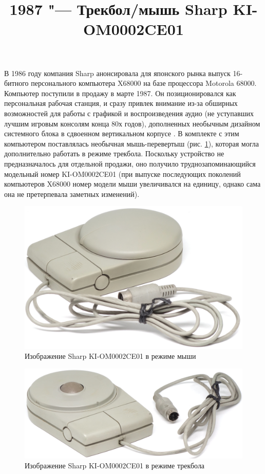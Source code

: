 \documentclass[11pt, a4paper]{article}
\begin{document}
\title{1987 "--- Трекбол/мышь Sharp KI-OM0002CE01}
\date{}
\maketitle
{}

В 1986 году компания Sharp анонсировала для японского рынка выпуск 16-битного персонального компьютера  X68000 на базе процессора Motorola 68000. Компьютер поступили в продажу в марте 1987. Он позиционировался как персональная рабочая станция, и сразу привлек внимание из-за обширных возможностей для работы с графикой и воспроизведения аудио (не уступавших лучшим игровым консолям конца 80х годов), дополненных необычным дизайном системного блока в сдвоенном вертикальном корпусе \cite{museum}. В комплекте с этим компьютером поставлялась необычная мышь-перевертыш (рис. \ref{fig:SharpConvertibleMouse}), которая могла дополнительно работать в режиме трекбола. Поскольку устройство не предназначалось для отдельной продажи, оно получило труднозапоминающийся модельный номер KI-OM0002CE01 (при выпуске последующих поколений компьютеров X68000 номер модели мыши увеличивался на единицу, однако сама она не претерпевала заметных изменений).

\begin{figure}[h]
    \centering
    \includegraphics[scale=0.65]{1987_sharp_convertible/picmouse_60}
    \caption{Изображение Sharp KI-OM0002CE01 в режиме мыши}
    \label{fig:SharpConvertibleMouse}
\end{figure}

\begin{figure}[h]
    \centering
    \includegraphics[scale=0.65]{1987_sharp_convertible/picball_60}
    \caption{Изображение Sharp KI-OM0002CE01 в режиме трекбола}
    \label{fig:SharpConvertibleTrackball}
\end{figure}
\end{document}
